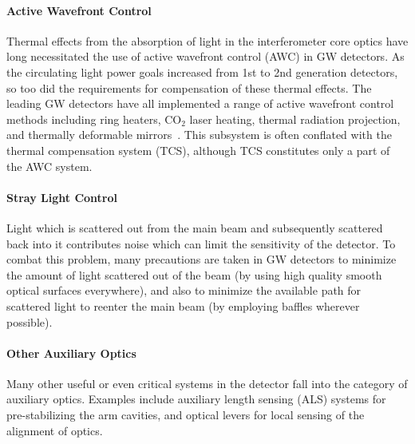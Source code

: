 \paragraph{\bf Active Wavefront Control}
Thermal effects from the absorption of light in the interferometer core optics have long necessitated the use of active wavefront control (AWC) in GW detectors. As the circulating light power goals increased from 1st to 2nd generation detectors, so too did the requirements for compensation of these thermal effects. The leading GW detectors have all implemented a range of active wavefront control methods including ring heaters, CO$_2$ laser heating, thermal radiation projection, and thermally deformable mirrors~\cite{aLIGO_AWC, AdVirgo_IO}. This subsystem is often conflated with the thermal compensation system (TCS), although TCS constitutes only a part of the AWC system. 
\paragraph{\bf Stray Light Control}
Light which is scattered out from the main beam and subsequently scattered back into it contributes noise which can limit the sensitivity of the detector. To combat this problem, many precautions are taken in GW detectors to minimize the amount of light scattered out of the beam (by using high quality smooth optical surfaces everywhere), and also to minimize the available path for scattered light to reenter the main beam (by employing baffles wherever possible). 
\paragraph{\bf Other Auxiliary Optics}
Many other useful or even critical systems in the detector fall into the category of auxiliary optics. Examples include 
auxiliary length sensing (ALS) systems for pre-stabilizing the arm cavities, and optical levers for local sensing of the alignment of optics.


